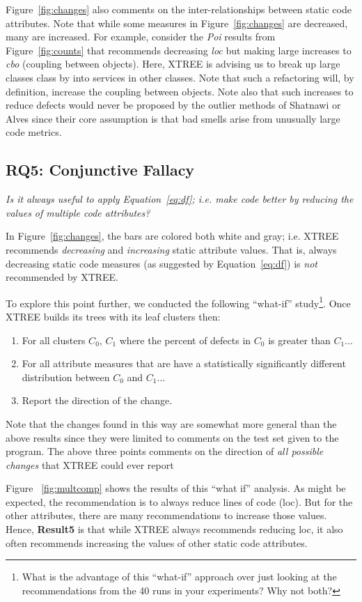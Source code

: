 \documentclass[twocolumn,5p]{elsarticle}
\newcommand{\be}{\begin{enumerate}}
\newcommand{\ee}{\end{enumerate}}
\newcommand{\fig}[1]{Figure~\ref{fig:#1}}
\newcommand{\eq}[1]{Equation~\ref{eq:#1}}
\theoremstyle{break}
\begin{document}
\begin{itemize}
\fig{changes} also comments on the inter-relationships between static code attributes. Note that while some measures in
\fig{changes} are decreased, many are increased.  
For example, consider the {\em Poi} results
from \fig{counts} that recommends decreasing {\em loc}
but making large increases to {\em cbo} (coupling between
objects). Here, XTREE is advising us to break up
large classes class by into services
in other classes. Note that such a refactoring will, by
definition, increase the coupling between objects. 
Note also that such increases  to reduce
defects would never be proposed by the outlier methods
of Shatnawi or Alves since their core assumption is that bad
smells arise from unusually large code metrics.
 
\subsection{RQ5: Conjunctive Fallacy}

{\em  Is  it  always  useful  to  apply \eq{df};  i.e.   make  code  better  by  reducing  the  values  of multiple code attributes?}

In  \fig{changes}, the bars are colored both white and gray; i.e. XTREE recommends {\em decreasing} and {\em increasing} 
static attribute values. That is, always decreasing static code measures (as suggested by \eq{df}) is {\em not} recommended by XTREE.

To explore this point further, we conducted the following ``what-if'' study\footnote{What is the advantage of this ``what-if'' approach over just looking at the recommendations from the 40 runs in your experiments? Why not both?}. Once XTREE builds its trees with its leaf clusters then:
\be
\item For all clusters $C_0$, $C_1$ where the percent of defects in $C_0$ is greater than $C_1$...
\item For all attribute measures that are have a statistically significantly different distribution  between $C_0$ and $C_1$...
\item Report the direction of the change.
\ee
Note that the changes found in this way are somewhat more general than the above results
since they were  limited
to comments on the test set given to the program. The above three points comments on the direction of {\em all possible changes}
that XTREE could ever report


Figure ~\ref{fig:multcomp} shows the results of this ``what if'' analysis. As might be expected, the recommendation is to
always reduce lines of code (loc). But for the other attributes, there are many recommendations to increase those values.
Hence, {\bf Result5} is that while XTREE always  recommends reducing loc,
it also   often recommends increasing the values of other static code attributes.   


\end{itemize}
\end{document}
